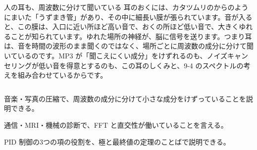 \begin{kotoba}
\small
{}
\end{kotoba}

\begin{column}{人の耳も、周波数に分けて聞いている}
耳のおくには、カタツムリのからのようにまいた「うずまき管」があり、その中に細長い膜が張られています。音が入ると、この膜は、入口に近い所ほど高い音で、おくの所ほど低い音で、大きくゆれることが知られています。ゆれた場所の神経が、脳に信号を送ります。つまり耳は、音を時間の波形のまま聞くのではなく、場所ごとに周波数の成分に分けて聞いているのです。MP3 が「聞こえにくい成分」をけずれるのも、ノイズキャンセリングが低い音を得意とするのも、この耳のしくみと、9-4 のスペクトルの考えを組み合わせているからです。
\end{column}

\begin{furikaeri}
\begin{checklist}
\item 音楽・写真の圧縮で、周波数の成分に分けて小さな成分をけずっていることを説明できる。
\item 通信・MRI・機械の診断で、FFT と直交性が働いていることを言える。
\item PID 制御の3つの項の役割を、極と最終値の定理のことばで説明できる。
\end{checklist}
\end{furikaeri}

